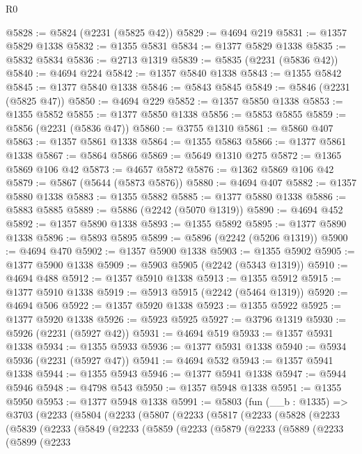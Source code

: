\begin{lexlean}{R0}
\begin{coremodule}
@5828 := @5824 (@2231 (@5825 @42))
@5829 := @4694 @219
@5831 := @1357 @5829 @1338
@5832 := @1355 @5831
@5834 := @1377 @5829 @1338
@5835 := @5832 @5834
@5836 := @2713 @1319
@5839 := @5835 (@2231 (@5836 @42))
@5840 := @4694 @224
@5842 := @1357 @5840 @1338
@5843 := @1355 @5842
@5845 := @1377 @5840 @1338
@5846 := @5843 @5845
@5849 := @5846 (@2231 (@5825 @47))
@5850 := @4694 @229
@5852 := @1357 @5850 @1338
@5853 := @1355 @5852
@5855 := @1377 @5850 @1338
@5856 := @5853 @5855
@5859 := @5856 (@2231 (@5836 @47))
@5860 := @3755 @1310
@5861 := @5860 @407
@5863 := @1357 @5861 @1338
@5864 := @1355 @5863
@5866 := @1377 @5861 @1338
@5867 := @5864 @5866
@5869 := @5649 @1310 @275
@5872 := @1365 @5869 @106 @42
@5873 := @4657 @5872
@5876 := @1362 @5869 @106 @42
@5879 := @5867 (@5644 (@5873 @5876))
@5880 := @4694 @407
@5882 := @1357 @5880 @1338
@5883 := @1355 @5882
@5885 := @1377 @5880 @1338
@5886 := @5883 @5885
@5889 := @5886 (@2242 (@5070 @1319))
@5890 := @4694 @452
@5892 := @1357 @5890 @1338
@5893 := @1355 @5892
@5895 := @1377 @5890 @1338
@5896 := @5893 @5895
@5899 := @5896 (@2242 (@5206 @1319))
@5900 := @4694 @470
@5902 := @1357 @5900 @1338
@5903 := @1355 @5902
@5905 := @1377 @5900 @1338
@5909 := @5903 @5905 (@2242 (@5343 @1319))
@5910 := @4694 @488
@5912 := @1357 @5910 @1338
@5913 := @1355 @5912
@5915 := @1377 @5910 @1338
@5919 := @5913 @5915 (@2242 (@5464 @1319))
@5920 := @4694 @506
@5922 := @1357 @5920 @1338
@5923 := @1355 @5922
@5925 := @1377 @5920 @1338
@5926 := @5923 @5925
@5927 := @3796 @1319
@5930 := @5926 (@2231 (@5927 @42))
@5931 := @4694 @519
@5933 := @1357 @5931 @1338
@5934 := @1355 @5933
@5936 := @1377 @5931 @1338
@5940 := @5934 @5936 (@2231 (@5927 @47))
@5941 := @4694 @532
@5943 := @1357 @5941 @1338
@5944 := @1355 @5943
@5946 := @1377 @5941 @1338
@5947 := @5944 @5946
@5948 := @4798 @543
@5950 := @1357 @5948 @1338
@5951 := @1355 @5950
@5953 := @1377 @5948 @1338
@5991 := @5803
    (fun (__b : @1335) =>
    @3703
      (@2233
        (@5804
          (@2233
            (@5807
              (@2233
                (@5817
                  (@2233
                    (@5828
                      (@2233
                        (@5839
                          (@2233
                            (@5849
                              (@2233
                                (@5859
                                  (@2233
                                    (@5879
                                      (@2233
                                        (@5889
                                          (@2233
                                            (@5899
                                              (@2233

\end{coremodule}
\end{lexlean}
